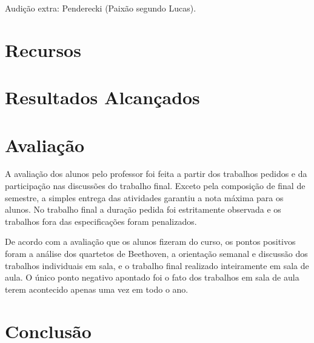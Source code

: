 \documentclass{article}
\begin{document}
Audição extra: Penderecki (Paixão segundo Lucas).

\section{Recursos}
\label{sec:recursos}

\section{Resultados Alcançados}
\label{sec:result-alcanc}

\section{Avaliação}
\label{sec:avaliacao}

A avaliação dos alunos pelo professor foi feita a partir dos trabalhos
pedidos e da participação nas discussões do trabalho final. Exceto
pela composição de final de semestre, a simples entrega das atividades
garantiu a nota máxima para os alunos. No trabalho final a duração
pedida foi estritamente observada e os trabalhos fora das
especificações foram penalizados.

De acordo com a avaliação que os alunos fizeram do curso, os pontos
positivos foram a análise dos quartetos de Beethoven, a orientação
semanal e discussão dos trabalhos individuais em sala, e o trabalho
final realizado inteiramente em sala de aula. O único ponto negativo
apontado foi o fato dos trabalhos em sala de aula terem acontecido
apenas uma vez em todo o ano.

\section{Conclusão}
\label{sec:conclusao}



\renewcommand{\refname}{Bibliografia}

\nocite{Beethoven1970,Heussenstamm1987,adler89:_study_orches,Kennan1997,stone80:_music_notat_twent_centur}



\end{document}
